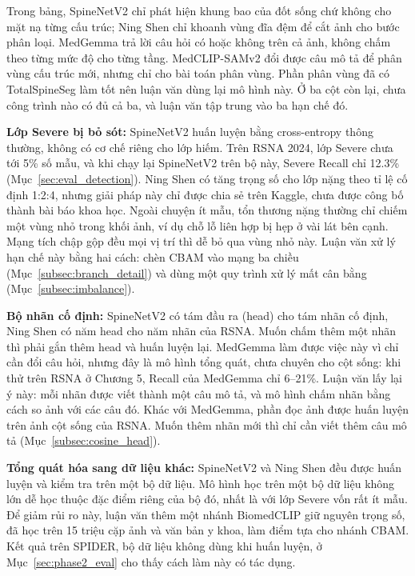 Trong bảng, SpineNetV2 chỉ phát hiện khung bao của đốt sống chứ không cho mặt nạ từng cấu trúc; Ning Shen chỉ khoanh vùng đĩa đệm để cắt ảnh cho bước phân loại. MedGemma trả lời câu hỏi có hoặc không trên cả ảnh, không chấm theo từng mức độ cho từng tầng. MedCLIP-SAMv2 đổi được câu mô tả để phân vùng cấu trúc mới, nhưng chỉ cho bài toán phân vùng. Phần phân vùng đã có TotalSpineSeg làm tốt nên luận văn dùng lại mô hình này. Ở ba cột còn lại, chưa công trình nào có đủ cả ba, và luận văn tập trung vào ba hạn chế đó.

\textbf{Lớp Severe bị bỏ sót:} SpineNetV2 huấn luyện bằng cross-entropy thông thường, không có cơ chế riêng cho lớp hiếm. Trên RSNA 2024, lớp Severe chưa tới 5\% số mẫu, và khi chạy lại SpineNetV2 trên bộ này, Severe Recall chỉ 12.3\% (Mục~\ref{sec:eval_detection}). Ning Shen có tăng trọng số cho lớp nặng theo tỉ lệ cố định 1:2:4, nhưng giải pháp này chỉ được chia sẻ trên Kaggle, chưa được công bố thành bài báo khoa học. Ngoài chuyện ít mẫu, tổn thương nặng thường chỉ chiếm một vùng nhỏ trong khối ảnh, ví dụ chỗ lỗ liên hợp bị hẹp ở vài lát bên cạnh. Mạng tích chập gộp đều mọi vị trí thì dễ bỏ qua vùng nhỏ này. Luận văn xử lý hạn chế này bằng hai cách: chèn CBAM vào mạng ba chiều (Mục~\ref{subsec:branch_detail}) và dùng một quy trình xử lý mất cân bằng (Mục~\ref{subsec:imbalance}).

\textbf{Bộ nhãn cố định:} SpineNetV2 có tám đầu ra (head) cho tám nhãn cố định, Ning Shen có năm head cho năm nhãn của RSNA. Muốn chấm thêm một nhãn thì phải gắn thêm head và huấn luyện lại. MedGemma làm được việc này vì chỉ cần đổi câu hỏi, nhưng đây là mô hình tổng quát, chưa chuyên cho cột sống: khi thử trên RSNA ở Chương 5, Recall của MedGemma chỉ 6--21\%. Luận văn lấy lại ý này: mỗi nhãn được viết thành một câu mô tả, và mô hình chấm nhãn bằng cách so ảnh với các câu đó. Khác với MedGemma, phần đọc ảnh được huấn luyện trên ảnh cột sống của RSNA. Muốn thêm nhãn mới thì chỉ cần viết thêm câu mô tả (Mục~\ref{subsec:cosine_head}).

\textbf{Tổng quát hóa sang dữ liệu khác:} SpineNetV2 và Ning Shen đều được huấn luyện và kiểm tra trên một bộ dữ liệu. Mô hình học trên một bộ dữ liệu không lớn dễ học thuộc đặc điểm riêng của bộ đó, nhất là với lớp Severe vốn rất ít mẫu. Để giảm rủi ro này, luận văn thêm một nhánh BiomedCLIP giữ nguyên trọng số, đã học trên 15 triệu cặp ảnh và văn bản y khoa, làm điểm tựa cho nhánh CBAM. Kết quả trên SPIDER, bộ dữ liệu không dùng khi huấn luyện, ở Mục~\ref{sec:phase2_eval} cho thấy cách làm này có tác dụng.

